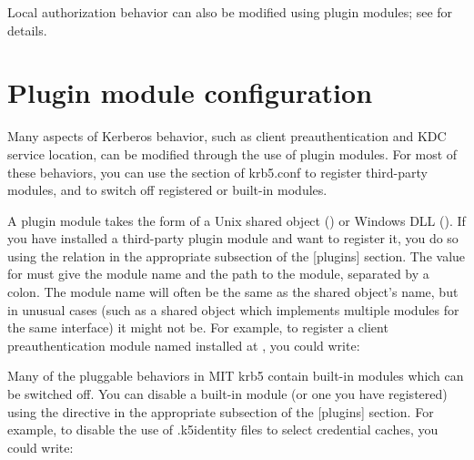 \documentclass[letterpaper,10pt,english]{sphinxmanual}
\begin{document}
Local authorization behavior can also be modified using plugin
modules; see  for details.


\section{Plugin module configuration}
\label{\detokenize{admin/host_config:plugin-config}}\label{\detokenize{admin/host_config:plugin-module-configuration}}
Many aspects of Kerberos behavior, such as client preauthentication
and KDC service location, can be modified through the use of plugin
modules.  For most of these behaviors, you can use the {\hyperref[\detokenize{admin/conf_files/krb5_conf:plugins}]{}}
section of krb5.conf to register third-party modules, and to switch
off registered or built-in modules.

A plugin module takes the form of a Unix shared object
() or Windows DLL ().  If you have
installed a third-party plugin module and want to register it, you do
so using the  relation in the appropriate subsection of the
{[}plugins{]} section.  The value for  must give the module name
and the path to the module, separated by a colon.  The module name
will often be the same as the shared object’s name, but in unusual
cases (such as a shared object which implements multiple modules for
the same interface) it might not be.  For example, to register a
client preauthentication module named  installed at
, you could write:

%
\begin{sphinxVerbatim}[commandchars=\\\{\}]
\PYG{p}{[}\PYG{p}{]}
      
          
\end{sphinxVerbatim}

Many of the pluggable behaviors in MIT krb5 contain built-in modules
which can be switched off.  You can disable a built-in module (or one
you have registered) using the  directive in the
appropriate subsection of the {[}plugins{]} section.  For example, to
disable the use of .k5identity files to select credential caches, you
could write:
\end{document}
